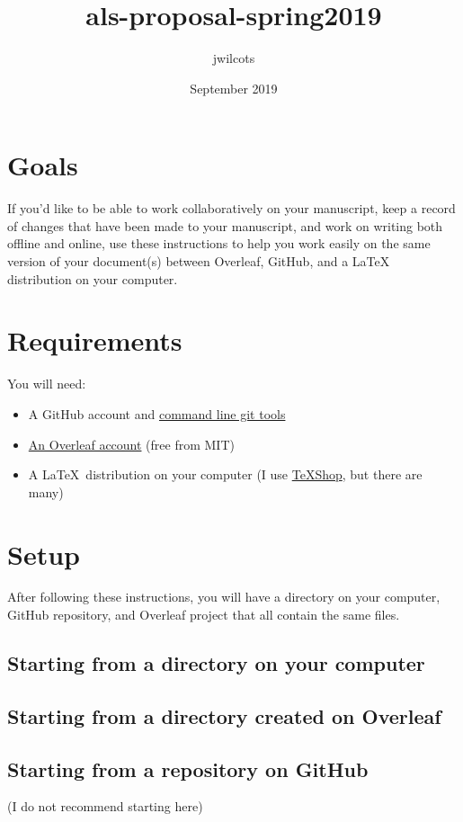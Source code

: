 \documentclass[10pt]{article}
\title{als-proposal-spring2019}
\author{jwilcots }
\date{September 2019}
\begin{document}
\section{Goals}
If you'd like to be able to work collaboratively on your manuscript, keep a record of changes that have been made to your manuscript, and work on writing both offline and online, use these instructions to help you work easily on the same version of your document(s) between Overleaf, GitHub, and a \LaTeX~ distribution on your computer.

\section{Requirements}
You will need:
\begin{itemize}
\item A GitHub account and \href{https://git-scm.com/book/en/v2/Getting-Started-Installing-Git}{command line git tools}
\item \href{https://www.overleaf.com/edu/mit}{An Overleaf account} (free from MIT)
\item A \LaTeX~distribution on your computer (I use \href{https://pages.uoregon.edu/koch/texshop/}{TeXShop}, but there are many)
\end{itemize}

\section{Setup}
After following these instructions, you will have a directory on your computer, GitHub repository, and Overleaf project that all contain the same files.
\subsection{Starting from a directory on your computer}

\subsection{Starting from a directory created on Overleaf}

\subsection{Starting from a repository on GitHub}
(I do not recommend starting here)
\end{document}
